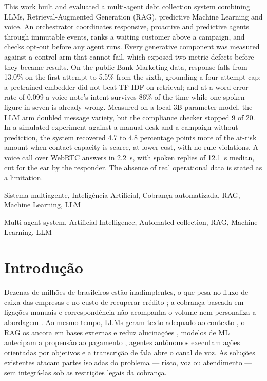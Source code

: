 \documentclass[portuguese]{sbcreviews-2025}%
\begin{document}
\begin{frontmatter}
\begin{abstract-en}
This work built and evaluated a multi-agent debt collection system combining LLMs, Retrieval-Augmented Generation (RAG), predictive Machine Learning and voice. An orchestrator coordinates responsive, proactive and predictive agents through immutable events, ranks a waiting customer above a campaign, and checks opt-out before any agent runs. Every generative component was measured against a control arm that cannot fail, which exposed two metric defects before they became results. On the public Bank Marketing data, response falls from 13.0\% on the first attempt to 5.5\% from the sixth, grounding a four-attempt cap; a pretrained embedder did not beat TF-IDF on retrieval; and at a word error rate of 0.099 a voice note's intent survives 86\% of the time while one spoken figure in seven is already wrong. Measured on a local 3B-parameter model, the LLM arm doubled message variety, but the compliance checker stopped 9 of 20. In a simulated experiment against a manual desk and a campaign without prediction, the system recovered 4.7 to 4.8 percentage points more of the at-risk amount when contact capacity is scarce, at lower cost, with no rule violations. A voice call over WebRTC answers in 2.2~s, with spoken replies of 12.1~s median, cut for the ear by the responder. The absence of real operational data is stated as a limitation.
\end{abstract-en}

\begin{pchaves}
Sistema multiagente, Inteligência Artificial, Cobrança automatizada, RAG, Machine Learning, LLM
\end{pchaves}

\begin{keywords}
Multi-agent system, Artificial Intelligence, Automated collection, RAG, Machine Learning, LLM
\end{keywords}

\end{frontmatter}

\section{Introdução}
\label{sec:intro}

Dezenas de milhões de brasileiros estão inadimplentes, o que pesa no fluxo de caixa das empresas e no custo de recuperar crédito \cite{serasa2024}; a cobrança baseada em ligações manuais e correspondência não acompanha o volume nem personaliza a abordagem \cite{cnc2025}. Ao mesmo tempo, LLMs geram texto adequado ao contexto \cite{brown2020language}, o RAG os ancora em bases externas e reduz alucinações \cite{lewis2020retrieval}, modelos de ML antecipam a propensão ao pagamento \cite{hastie2009elements,lessmann2015benchmarking}, agentes autônomos executam ações orientadas por objetivos \cite{wang2024survey} e a transcrição de fala \cite{radford2023robust} abre o canal de voz. As soluções existentes atacam partes isoladas do problema --- risco, voz ou atendimento --- sem integrá-las sob as restrições legais da cobrança.
\end{document}
